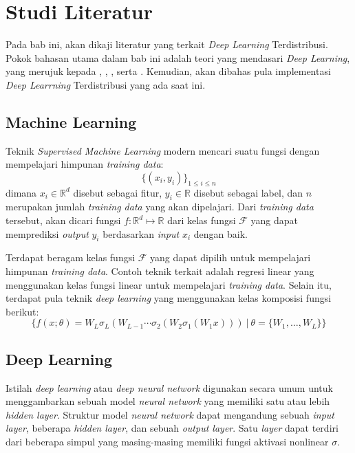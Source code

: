 \chapter{Studi Literatur}
Pada bab ini, akan dikaji literatur yang terkait \emph{Deep Learning} Terdistribusi. Pokok bahasan utama dalam bab ini adalah teori yang mendasari \emph{Deep Learning}, yang merujuk kepada \textcite{JiangDistributed}, \textcite{Choi2019}, \textcite{Fan2019}, serta \textcite{LeCun2015}. Kemudian, akan dibahas pula implementasi \emph{Deep Learrning} Terdistribusi yang ada saat ini.

\section{Machine Learning}
Teknik \emph{Supervised Machine Learning} modern mencari suatu fungsi dengan mempelajari himpunan \emph{training data}:
\begin{equation}
  \{(x_i, y_i)\}_{1 \le i \le n}
\end{equation}
dimana $x_i \in \mathbb{R}^d$ disebut sebagai fitur,  $y_i \in \mathbb{R}$ disebut sebagai label, dan $n$ merupakan jumlah \emph{training data} yang akan dipelajari. Dari \emph{training data} tersebut, akan dicari fungsi $f: \mathbb{R}^d \mapsto \mathbb{R}$ dari kelas fungsi $\mathcal{F}$ yang dapat memprediksi \emph{output} $y_i$ berdasarkan \emph{input} $x_i$ dengan baik.

Terdapat beragam kelas fungsi \(\mathcal{F}\) yang dapat dipilih untuk mempelajari himpunan \emph{training data}. Contoh teknik terkait adalah regresi linear yang menggunakan kelas fungsi linear untuk mempelajari \emph{training data}. Selain itu, terdapat pula teknik \emph{deep learning} yang menggunakan kelas komposisi fungsi berikut:
\begin{equation}
  \{
  f(x;\theta) = W_L\sigma_L(W_{L-1} \cdots \sigma_2(W_2\sigma_1(W_1 x)))\ \vert \ \theta = \{W_1,\dots,W_L\}
  \}
\end{equation}

\section{Deep Learning}
Istilah \emph{deep learning} atau \emph{deep neural network} digunakan secara umum untuk menggambarkan sebuah model \emph{neural network} yang memiliki satu atau lebih \emph{hidden layer}. Struktur model \emph{neural network} dapat mengandung sebuah \emph{input layer}, beberapa \emph{hidden layer}, dan sebuah \emph{output layer}. Satu \emph{layer} dapat terdiri dari beberapa simpul yang masing-masing memiliki fungsi aktivasi nonlinear $\sigma$.

